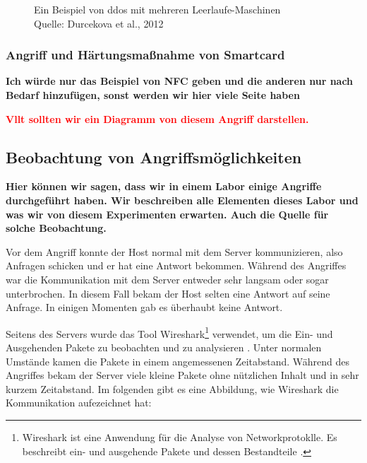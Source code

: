 \begin{figure}[H]
  \caption{Ein Beispiel von \acrfull{ddos} mit mehreren Leerlaufe-Maschinen
  \\ Quelle: Durcekova et al., 2012}
  \label{fig:VDSD}
\end{figure}

\subsubsection{Angriff und Härtungsmaßnahme von Smartcard}
\textbf{Ich würde nur das Beispiel von NFC geben und die anderen nur nach Bedarf hinzufügen, sonst werden wir hier
viele Seite haben}

\textcolor{red}{\textbf{Vllt sollten wir ein Diagramm von diesem Angriff darstellen.}}


\subsection{Beobachtung von Angriffsmöglichkeiten}
\textbf{Hier können wir sagen, dass wir in einem Labor einige Angriffe durchgeführt haben. Wir beschreiben alle Elementen
dieses Labor und was wir von diesem Experimenten erwarten. Auch die Quelle für solche Beobachtung.}

Vor dem Angriff konnte der Host normal mit dem Server kommunizieren, also Anfragen schicken und er hat eine Antwort bekommen.
Während des Angriffes war die Kommunikation mit dem Server entweder sehr langsam oder sogar unterbrochen. In diesem Fall
bekam der Host selten eine Antwort auf seine Anfrage. In einigen Momenten gab es überhaubt keine Antwort. 

Seitens des Servers wurde das Tool Wireshark\footnote{Wireshark ist eine Anwendung für die Analyse von Networkprotoklle.
Es beschreibt ein- und ausgehende Pakete und dessen Bestandteile \cite{refst:wisa}.} verwendet, um die Ein- und Ausgehenden
Pakete zu beobachten und zu analysieren \cite{refart:UBEC}. Unter normalen Umstände kamen die Pakete in einem angemessenen
Zeitabstand. Während des Angriffes bekam der Server viele kleine Pakete ohne nützlichen Inhalt und in sehr kurzem Zeitabstand.
Im folgenden gibt es eine Abbildung, wie Wireshark die Kommunikation aufezeichnet hat:

